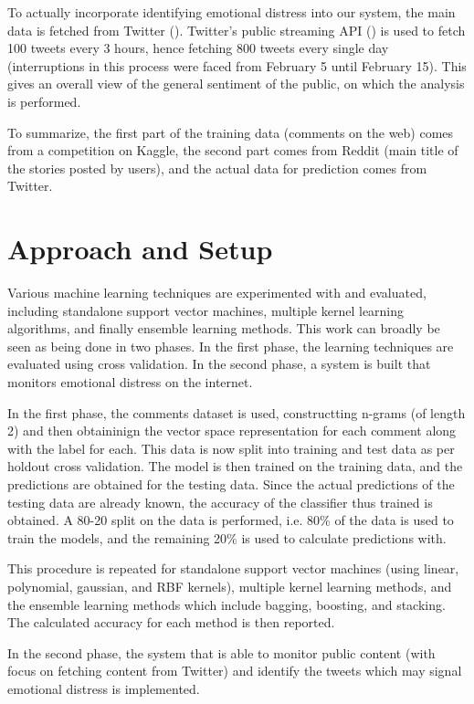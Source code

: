 To actually incorporate identifying emotional distress into our system, the main data is fetched from Twitter (\cite{twitter}). Twitter's public streaming API (\cite{twitter_streaming_api}) is used to fetch 100 tweets every 3 hours, hence fetching 800 tweets every single day (interruptions in this process were faced from February 5 until February 15). This gives an overall view of the general sentiment of the public, on which the analysis is performed.

To summarize, the first part of the training data (comments on the web) comes from a competition on Kaggle, the second part comes from Reddit (main title of the stories posted by users), and the actual data for prediction comes from Twitter.

\section{Approach and Setup}
Various machine learning techniques are experimented with and evaluated, including standalone support vector machines, multiple kernel learning algorithms, and finally ensemble learning methods. This work can broadly be seen as being done in two phases. In the first phase, the learning techniques are evaluated using cross validation. In the second phase, a system is built that monitors emotional distress on the internet.

In the first phase, the comments \cite{kaggle} dataset is used, constructting n-grams (of length 2) and then obtaininign the vector space representation for each comment along with the label for each. This data is now split into training and test data as per holdout cross validation. The model is then trained on the training data, and the predictions are obtained for the testing data. Since the actual predictions of the testing data are already known, the accuracy of the classifier thus trained is obtained. A 80-20 split on the data is performed, i.e. 80\% of the data is used to train the models, and the remaining 20\% is used to calculate predictions with.

This procedure is repeated for standalone support vector machines (using linear, polynomial, gaussian, and RBF kernels), multiple kernel learning methods, and the ensemble learning methods which include bagging, boosting, and stacking. The calculated accuracy for each method is then reported.

In the second phase, the system that is able to monitor public content (with focus on fetching content from Twitter) and identify the tweets which may signal emotional distress is implemented.

